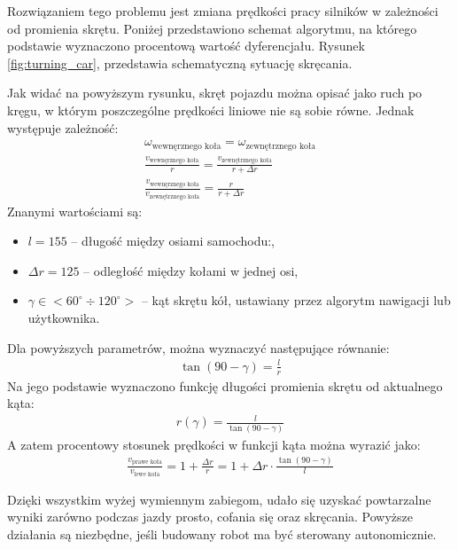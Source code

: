         Rozwiązaniem tego problemu jest zmiana prędkości pracy silników w zależności od promienia skrętu.
        Poniżej przedstawiono schemat algorytmu, na którego podstawie wyznaczono procentową wartość dyferencjału.
        Rysunek \ref{fig:turning_car}, przedstawia schematyczną sytuację skręcania.
        

        Jak widać na powyższym rysunku, skręt pojazdu można opisać jako ruch po kręgu, w którym poszczególne prędkości liniowe nie są sobie równe.
        Jednak występuje zależność:
        \begin{gather}
            \omega_{\text{wewnęrznego koła}} = \omega_{\text{zewnętrznego koła}}\\
            \frac{v_{\text{wewnęrznego koła}}}{r} = \frac{v_{\text{zewnętrznego koła}}}{r + \Delta r}\\
            \frac{v_\text{wewnęrznego koła}}{v_{\text{zewnętrznego koła}}} = \frac{r}{r + \Delta r}
        \end{gather}
        Znanymi wartościami są:
        \begin{itemize}
            \item $l = 155$ -- długość między osiami samochodu:,
            \item $\Delta r = 125$ -- odległość między kołami w jednej osi,
            \item $\gamma \in <60^\circ \div 120^\circ>$ -- kąt skrętu kół, ustawiany przez algorytm nawigacji lub użytkownika.
        \end{itemize}
        Dla powyższych parametrów, można wyznaczyć następujące równanie:
        \begin{gather}
            \tan \left(90 - \gamma\right) = \frac{l}{r}
        \end{gather}
        Na jego podstawie wyznaczono funkcję długości promienia skrętu od aktualnego kąta:
        \begin{gather}
            r(\gamma) = \frac{l}{\tan(90-\gamma)}
            \label{eq:turning_radius}
        \end{gather}
        A zatem procentowy stosunek prędkości w funkcji kąta można wyrazić jako:
        \begin{gather}
            \frac{v_{\text{prawe koła}}}{v_{\text{lewe koła}}} = 1 + \frac{\Delta r}{r} = 1 + \Delta r \cdot \frac{\tan(90 - \gamma)}{l}
        \end{gather}


    Dzięki wszystkim wyżej wymiennym zabiegom, udało się uzyskać powtarzalne wyniki zarówno podczas jazdy prosto, cofania się oraz skręcania.
    Powyższe działania są niezbędne, jeśli budowany robot ma być sterowany autonomicznie.
